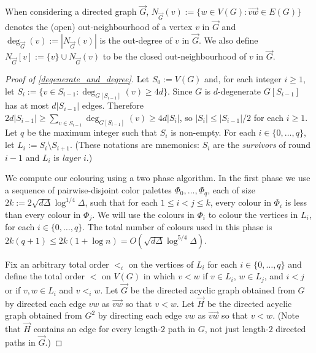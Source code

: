 \documentclass{patmorin}
\newcommand{\defin}[1]{\emph{\color{brightmaroon}#1}}
\begin{document}
When considering a directed graph $\overrightarrow{G}$, $N_{\overrightarrow{G}}(v):=\{w\in V(G):\overrightarrow{vw}\in E(G)\}$ denotes the (open) out-neighbourhood of a vertex $v$ in $\overrightarrow{G}$ and $\deg_{\overrightarrow{G}}(v):=|N_{\overrightarrow{G}}(v)|$ is the out-degree of $v$ in $\overrightarrow{G}$.  We also define $N_{\overrightarrow{G}}[v]:=\{v\}\cup N_{\overrightarrow{G}}(v)$ to be the closed out-neighbourhood of $v$ in $\overrightarrow{G}$.

\begin{proof}[Proof of \cref{degenerate_and_degree}]
  Let $S_0:=V(G)$ and, for each integer $i\ge 1$, let $S_i:=\{v\in S_{i-1}:\deg_{G[S_{i-1}]}(v)\ge 4d\}$.  Since $G$ is $d$-degenerate $G[S_{i-1}]$ has at most $d|S_{i-1}|$ edges.  Therefore $2d|S_{i-1}|\ge \sum_{v\in S_{i-1}} \deg_{G[S_{i-1}]}(v)\ge 4d|S_i|$, so $|S_i|\le |S_{i-1}|/2$ for each $i\ge 1$.  Let $q$ be the maximum integer such that $S_i$ is non-empty.  For each $i\in\{0,\ldots,q\}$, let $L_i:=S_i\setminus S_{i+1}$.  (These notations are mnemonics: $S_i$ are the \defin{survivors} of round $i-1$ and $L_i$ is \defin{layer} $i$.)

  We compute our colouring using a two phase algorithm. In the first phase we use a sequence of pairwise-disjoint color palettes $\Phi_0,\ldots,\Phi_{q}$, each of size $2k:=2\sqrt{d\Delta}\log^{1/4}\Delta$, such that for each $1\le i < j\le k$, every colour in $\Phi_i$ is less than every colour in $\Phi_j$.  We will use the colours in $\Phi_i$ to colour the vertices in $L_i$, for each $i\in\{0,\ldots,q\}$.  The total number of colours used in this phase is $2k(q+1)\le 2k(1+\log n)=O(\sqrt{d\Delta}\log^{5/4}\Delta)$.


  Fix an arbitrary total order $<_i$ on the vertices of $L_i$ for each $i\in\{0,\ldots,q\}$ and define the total order $<$ on $V(G)$ in which $v <w$ if $v\in L_i$, $w\in L_j$, and $i<j$ or if $v,w\in L_i$ and $v<_iw$.  Let $\overrightarrow{G}$ be the directed acyclic graph obtained from $G$ by directed each edge $vw$ as $\overrightarrow{vw}$ so that $v<w$. Let $\overrightarrow{H}$ be the directed acyclic graph obtained from $G^2$ by directing each edge $vw$ as $\overrightarrow{vw}$ so that $v<w$.  (Note that $\overrightarrow{H}$ contains an edge for every length-$2$ path in $G$, not just length-$2$ directed paths in $\overrightarrow{G}$.)


\end{proof}
\end{document}
